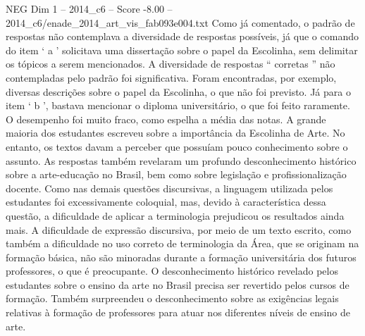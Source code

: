 \begin{textsample}{NEG Dim 1 – 2014\_c6 – Score -8.00 – 2014\_c6/enade\_2014\_art\_vis\_fab093e004.txt}
Como já comentado, o padrão de respostas não contemplava a diversidade de respostas possíveis, já que o comando do item ‘ a ’ solicitava uma dissertação sobre o papel da Escolinha, sem delimitar os tópicos a serem mencionados.
A diversidade de respostas “ corretas ” não contempladas pelo padrão foi significativa.
Foram encontradas, por exemplo, diversas descrições sobre o papel da Escolinha, o que não foi previsto.
Já para o item ‘ b ’, bastava mencionar o diploma universitário, o que foi feito raramente.
O desempenho foi muito fraco, como espelha a média das notas.
A grande maioria dos estudantes escreveu sobre a importância da Escolinha de Arte.
No entanto, os textos davam a perceber que possuíam pouco conhecimento sobre o assunto.
As respostas também revelaram um profundo desconhecimento histórico sobre a arte-educação no Brasil, bem como sobre legislação e profissionalização docente.
Como nas demais questões discursivas, a linguagem utilizada pelos estudantes foi excessivamente coloquial, mas, devido à característica dessa questão, a dificuldade de aplicar a terminologia prejudicou os resultados ainda mais.
A dificuldade de expressão discursiva, por meio de um texto escrito, como também a dificuldade no uso correto de terminologia da Área, que se originam na formação básica, não são minoradas durante a formação universitária dos futuros professores, o que é preocupante.
O desconhecimento histórico revelado pelos estudantes sobre o ensino da arte no Brasil precisa ser revertido pelos cursos de formação.
Também surpreendeu o desconhecimento sobre as exigências legais relativas à formação de professores para atuar nos diferentes níveis de ensino de arte.

\end{textsample}
